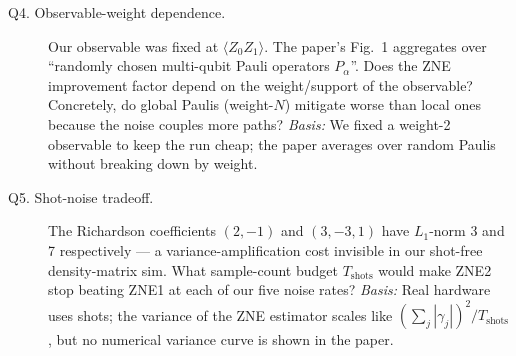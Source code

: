 \begin{description}
  \item[Q4. Observable-weight dependence.] Our observable was fixed at $\langle Z_0 Z_1\rangle$. The paper's Fig.~1 aggregates over ``randomly chosen multi-qubit Pauli operators $P_\alpha$''. Does the ZNE improvement factor depend on the weight/support of the observable? Concretely, do global Paulis (weight-$N$) mitigate worse than local ones because the noise couples more paths?
  \emph{Basis:} We fixed a weight-2 observable to keep the run cheap; the paper averages over random Paulis without breaking down by weight.
  \item[Q5. Shot-noise tradeoff.] The Richardson coefficients $(2,-1)$ and $(3,-3,1)$ have $L_1$-norm 3 and 7 respectively --- a variance-amplification cost invisible in our shot-free density-matrix sim. What sample-count budget $T_{\text{shots}}$ would make ZNE2 stop beating ZNE1 at each of our five noise rates?
  \emph{Basis:} Real hardware uses shots; the variance of the ZNE estimator scales like $(\sum_j |\gamma_j|)^2 / T_{\text{shots}}$, but no numerical variance curve is shown in the paper.
\end{description}
